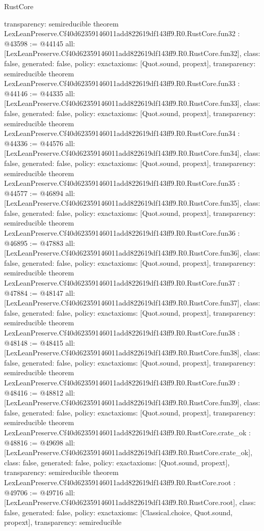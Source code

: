 \begin{lexlean}{RustCore}
\begin{coremodule}
{  transparency: semireducible
}
theorem LexLeanPreserve.Cf40d62359146011add822619df143ff9.R0.RustCore.fun32 : @43598 := @44145 {
  all: [LexLeanPreserve.Cf40d62359146011add822619df143ff9.R0.RustCore.fun32],
  class: false,
  generated: false,
  policy: exact{axioms: [Quot.sound, propext]},
  transparency: semireducible
}
theorem LexLeanPreserve.Cf40d62359146011add822619df143ff9.R0.RustCore.fun33 : @44146 := @44335 {
  all: [LexLeanPreserve.Cf40d62359146011add822619df143ff9.R0.RustCore.fun33],
  class: false,
  generated: false,
  policy: exact{axioms: [Quot.sound, propext]},
  transparency: semireducible
}
theorem LexLeanPreserve.Cf40d62359146011add822619df143ff9.R0.RustCore.fun34 : @44336 := @44576 {
  all: [LexLeanPreserve.Cf40d62359146011add822619df143ff9.R0.RustCore.fun34],
  class: false,
  generated: false,
  policy: exact{axioms: [Quot.sound, propext]},
  transparency: semireducible
}
theorem LexLeanPreserve.Cf40d62359146011add822619df143ff9.R0.RustCore.fun35 : @44577 := @46894 {
  all: [LexLeanPreserve.Cf40d62359146011add822619df143ff9.R0.RustCore.fun35],
  class: false,
  generated: false,
  policy: exact{axioms: [Quot.sound, propext]},
  transparency: semireducible
}
theorem LexLeanPreserve.Cf40d62359146011add822619df143ff9.R0.RustCore.fun36 : @46895 := @47883 {
  all: [LexLeanPreserve.Cf40d62359146011add822619df143ff9.R0.RustCore.fun36],
  class: false,
  generated: false,
  policy: exact{axioms: [Quot.sound, propext]},
  transparency: semireducible
}
theorem LexLeanPreserve.Cf40d62359146011add822619df143ff9.R0.RustCore.fun37 : @47884 := @48147 {
  all: [LexLeanPreserve.Cf40d62359146011add822619df143ff9.R0.RustCore.fun37],
  class: false,
  generated: false,
  policy: exact{axioms: [Quot.sound, propext]},
  transparency: semireducible
}
theorem LexLeanPreserve.Cf40d62359146011add822619df143ff9.R0.RustCore.fun38 : @48148 := @48415 {
  all: [LexLeanPreserve.Cf40d62359146011add822619df143ff9.R0.RustCore.fun38],
  class: false,
  generated: false,
  policy: exact{axioms: [Quot.sound, propext]},
  transparency: semireducible
}
theorem LexLeanPreserve.Cf40d62359146011add822619df143ff9.R0.RustCore.fun39 : @48416 := @48812 {
  all: [LexLeanPreserve.Cf40d62359146011add822619df143ff9.R0.RustCore.fun39],
  class: false,
  generated: false,
  policy: exact{axioms: [Quot.sound, propext]},
  transparency: semireducible
}
theorem LexLeanPreserve.Cf40d62359146011add822619df143ff9.R0.RustCore.crate_ok : @48816 := @49698 {
  all: [LexLeanPreserve.Cf40d62359146011add822619df143ff9.R0.RustCore.crate_ok],
  class: false,
  generated: false,
  policy: exact{axioms: [Quot.sound, propext]},
  transparency: semireducible
}
theorem LexLeanPreserve.Cf40d62359146011add822619df143ff9.R0.RustCore.root : @49706 := @49716 {
  all: [LexLeanPreserve.Cf40d62359146011add822619df143ff9.R0.RustCore.root],
  class: false,
  generated: false,
  policy: exact{axioms: [Classical.choice, Quot.sound, propext]},
  transparency: semireducible
}


\end{coremodule}
\end{lexlean}
